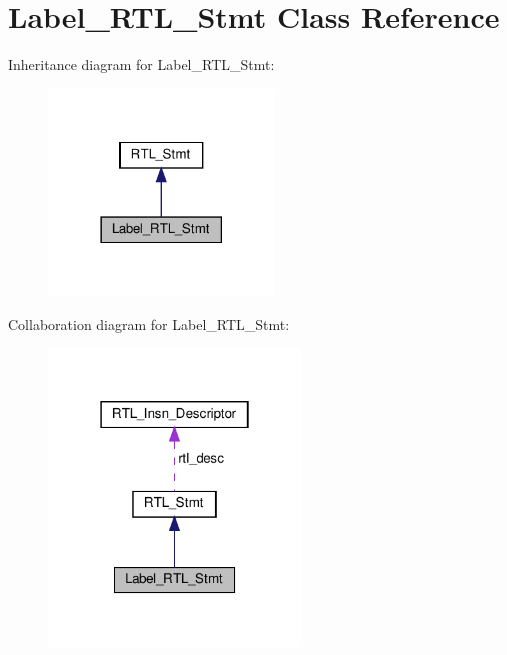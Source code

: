 \hypertarget{classLabel__RTL__Stmt}{}\section{Label\+\_\+\+R\+T\+L\+\_\+\+Stmt Class Reference}
\label{classLabel__RTL__Stmt}


Inheritance diagram for Label\+\_\+\+R\+T\+L\+\_\+\+Stmt\+:
\nopagebreak
\begin{figure}[H]
\begin{center}
\leavevmode
\includegraphics[width=170pt]{classLabel__RTL__Stmt__inherit__graph}
\end{center}
\end{figure}


Collaboration diagram for Label\+\_\+\+R\+T\+L\+\_\+\+Stmt\+:
\nopagebreak
\begin{figure}[H]
\begin{center}
\leavevmode
\includegraphics[width=190pt]{classLabel__RTL__Stmt__coll__graph}
\end{center}
\end{figure}

